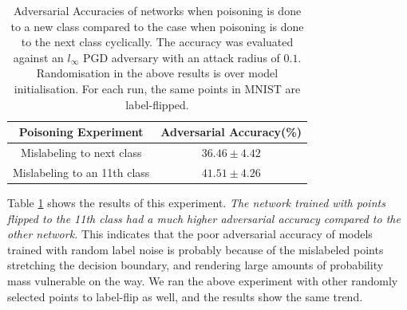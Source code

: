 \documentclass{ociamthesis}
\begin{document}
\begin{table}[h!]
\centering
\begin{tabular}{|c | c|} 
 \hline
 Poisoning Experiment & Adversarial Accuracy(\%) \\ [0.5ex] 
 \hline\hline
 Mislabeling to next class & $36.46 \pm 4.42$ \\
 \hline
 Mislabeling to an 11th class & $41.51 \pm 4.26$\\
 \hline
\end{tabular}
\caption{Adversarial Accuracies of networks when poisoning is done to a new
class compared to the case when poisoning is done to the next class cyclically.
The accuracy was evaluated against an $l_\infty$ PGD adversary with an attack
radius of $0.1$. Randomisation in the above results is over model
initialisation. For each run, the same points in MNIST are label-flipped.}
\label{table:mnist-class-10}
\end{table}

Table \ref{table:mnist-class-10} shows the results of this experiment. \emph{The
network trained with points flipped to the 11th class had a much higher
adversarial accuracy compared to the other network.} This indicates that the
poor adversarial accuracy of models trained with random label noise is probably
because of the mislabeled points stretching the decision boundary, and rendering
large amounts of probability mass vulnerable on the way. We ran the above
experiment with other randomly selected points to label-flip as well, and the
results show the same trend.


\end{document}

